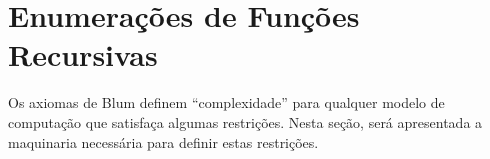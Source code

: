 \section{Enumerações de Funções Recursivas}
\label{sec:enumerations_of_recursive_functions}

Os axiomas de Blum definem ``complexidade''
para qualquer modelo de computação que satisfaça algumas restrições.
Nesta seção,
será apresentada a maquinaria necessária para definir estas restrições.
